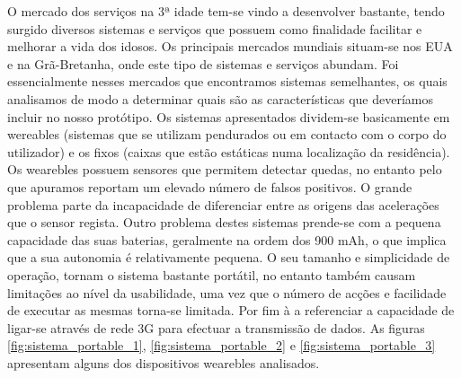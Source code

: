 O mercado dos serviços na 3ª idade tem-se vindo a desenvolver bastante, tendo surgido diversos sistemas e serviços que possuem como finalidade facilitar e melhorar a vida dos idosos. Os principais mercados mundiais\cite{relatorio} situam-se nos EUA e na Grã-Bretanha, onde este tipo de sistemas e serviços abundam. Foi essencialmente nesses mercados que encontramos sistemas semelhantes, os quais analisamos de modo a determinar quais são as características que deveríamos incluir no nosso protótipo.
Os sistemas apresentados dividem-se basicamente em wereables (sistemas que se utilizam pendurados ou em contacto com o corpo do utilizador) e os fixos (caixas que estão estáticas numa localização da residência).
Os wearebles possuem sensores que permitem detectar quedas, no entanto pelo que apuramos reportam um elevado número de falsos positivos. O grande problema parte da incapacidade de diferenciar entre as origens das acelerações que o sensor regista. Outro problema destes sistemas prende-se com a pequena capacidade das suas baterias, geralmente na ordem dos 900 mAh, o que implica que a sua autonomia é relativamente pequena. O seu tamanho e simplicidade de operação, tornam o sistema bastante portátil, no entanto também causam limitações ao nível da usabilidade, uma vez que o número de acções e facilidade de executar as mesmas torna-se limitada. Por fim à a referenciar a capacidade de ligar-se através de rede 3G para efectuar a transmissão de dados.
As figuras \ref{fig:sistema_portable_1}, \ref{fig:sistema_portable_2} e \ref{fig:sistema_portable_3} apresentam alguns dos dispositivos wearebles analisados.
